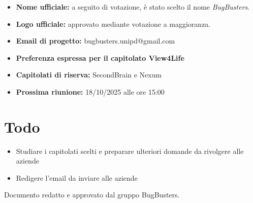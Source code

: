 \documentclass[a4paper,12pt]{article}
\begin{document}
\begin{itemize}
    \item \textbf{Nome ufficiale:} a seguito di votazione, è stato scelto il nome \emph{BugBusters}.
    \item \textbf{Logo ufficiale:} approvato mediante votazione a maggioranza.
    \item \textbf{Email di progetto:} {\small\textsf{bugbusters.unipd@gmail.com}}
    \item \textbf{Preferenza espressa per il capitolato View4Life}
    \item \textbf{Capitolati di riserva:} SecondBrain e Nexum
    \item \textbf{Prossima riunione:} 18/10/2025 alle ore 15:00
\end{itemize}

\section{Todo}

\begin{tcolorbox}[colback=secondaryblue!8,colframe=secondaryblue!60,arc=2mm,boxrule=0.5pt,left=10pt,right=10pt]
\begin{itemize}[topsep=5pt]
    \item Studiare i capitolati scelti e preparare ulteriori domande da rivolgere alle aziende
    \item Redigere l'email da inviare alle aziende
\end{itemize}
\end{tcolorbox}

\vfill
\begin{center}
    {\small\color{darkgray} Documento redatto e approvato dal gruppo BugBusters.}
\end{center}
\end{document}
